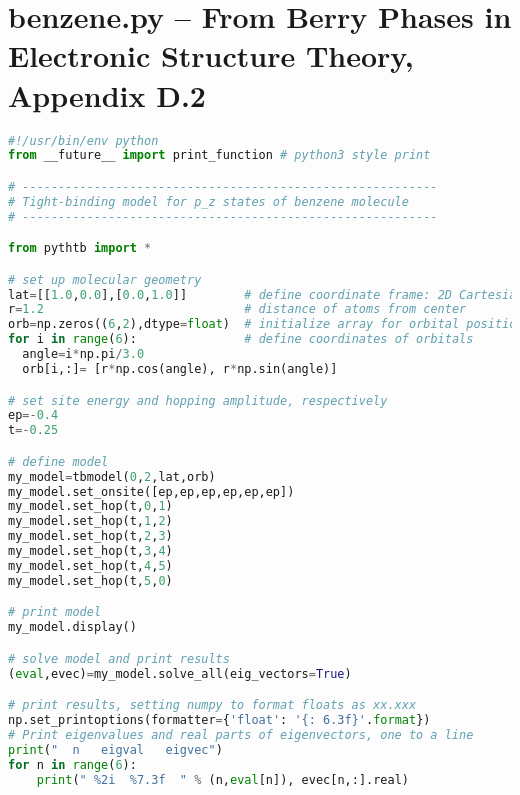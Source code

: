 \documentclass{jhwhw}
\begin{document}
\newpage

\section*{{\sc benzene.py} -- From Berry Phases in Electronic Structure Theory, Appendix D.2}
\begin{lstlisting}[language=Python]
#!/usr/bin/env python
from __future__ import print_function # python3 style print

# ----------------------------------------------------------
# Tight-binding model for p_z states of benzene molecule
# ----------------------------------------------------------

from pythtb import *

# set up molecular geometry
lat=[[1.0,0.0],[0.0,1.0]]        # define coordinate frame: 2D Cartesian
r=1.2                            # distance of atoms from center
orb=np.zeros((6,2),dtype=float)  # initialize array for orbital positions
for i in range(6):               # define coordinates of orbitals
  angle=i*np.pi/3.0
  orb[i,:]= [r*np.cos(angle), r*np.sin(angle)]

# set site energy and hopping amplitude, respectively
ep=-0.4
t=-0.25

# define model
my_model=tbmodel(0,2,lat,orb)
my_model.set_onsite([ep,ep,ep,ep,ep,ep])
my_model.set_hop(t,0,1)
my_model.set_hop(t,1,2)
my_model.set_hop(t,2,3)
my_model.set_hop(t,3,4)
my_model.set_hop(t,4,5)
my_model.set_hop(t,5,0)

# print model
my_model.display()

# solve model and print results
(eval,evec)=my_model.solve_all(eig_vectors=True)

# print results, setting numpy to format floats as xx.xxx
np.set_printoptions(formatter={'float': '{: 6.3f}'.format})
# Print eigenvalues and real parts of eigenvectors, one to a line
print("  n   eigval   eigvec")
for n in range(6):
    print(" %2i  %7.3f  " % (n,eval[n]), evec[n,:].real)
\end{lstlisting}
\end{document}
